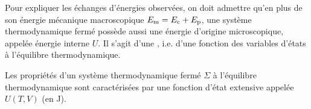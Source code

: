 \documentclass[12pt,fancy]{cours}
\begin{document}

Pour expliquer les échanges d'énergies observées, on doit admettre qu'en plus de son énergie mécanique macroscopique $E_{\rm m} = E_{\rm c} + E_{\rm p}$, une système thermodynamique fermé possède aussi une énergie d'origine microscopique, appelée énergie interne $U$. Il s'agit d'une , i.e. d'une fonction des variables d'états à l'équilibre thermodynamique.
\begin{definition}\label{def:}
  Les propriétés d’un système thermodynamique fermé $\Sigma$ à l’équilibre thermodynamique sont caractérisées par une fonction d’état extensive appelée  $U(T,V)$ (en J).
\end{definition}
\end{document}
